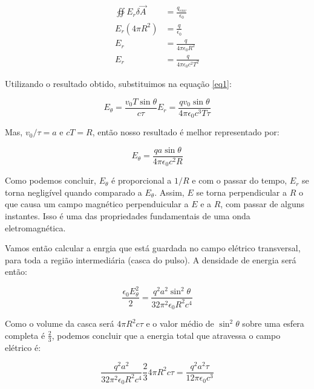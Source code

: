 \documentclass[12pt, letterpaper]{article}
\begin{document}
    \begin{equation} \label{eq2}
    \begin{split}
        \oiint E_r \delta \vec{A} &= \frac{q_{env}}{\epsilon_0} \\
        E_r(4\pi R^2) &= \frac{q}{\epsilon_0} \\
        E_r &= \frac{q}{4\pi\epsilon_0R^2} \\
        E_r &= \frac{q}{4\pi\epsilon_0c^2T^2} 
    \end{split}
    \end{equation}

    Utilizando o resultado obtido, substituimos na equação \ref{eq1}:

    \begin{equation} \label{eq3}
        E_\theta = \frac{v_0T\sin{\theta}}{c\tau}E_r = \frac{qv_0\sin{\theta}}{4\pi\epsilon_0c^3T\tau}
    \end{equation}

    Mas, $v_0 / \tau = a$ e $cT = R$, então nosso resultado é melhor representado por:

    \begin{equation} \label{eq4}
        E_\theta = \frac{qa\sin{\theta}}{4\pi\epsilon_0c^2R}
    \end{equation}

    Como podemos concluir, $E_\theta$ é proporcional a $1/R$ e com o passar do tempo, $E_r$ se torna negligível quando comparado a $E_\theta$. Assim, $E$ se torna perpendicular a $R$ o que causa um campo magnético perpenduicular a $E$ e a $R$, com passar de alguns instantes. Isso é uma das propriedades fundamentais de uma onda eletromagnética.

    Vamos então calcular a enrgia que está guardada no campo elétrico transversal, para toda a região intermediária (casca do pulso). A densidade de energia será então:

    \begin{equation} \label{eq5}
        \frac{\epsilon_0E_\theta^2}{2} = \frac{q^2a^2\sin^2{\theta}}{32\pi^2\epsilon_0R^2c^4}
    \end{equation}    

    Como o volume da casca será $4\pi R^2 c\tau$ e o valor médio de $\sin^2{\theta}$ sobre uma esfera completa é $\frac{2}{3}$, podemos concluir que a energia total que atravessa o campo elétrico é:

    \begin{equation} \label{eq6}
        \frac{q^2a^2}{32\pi^2\epsilon_0R^2c^4}\frac{2}{3}4\pi R^2c\tau = \frac{q^2a^2\tau}{12\pi\epsilon_0c^3}
    \end{equation}    
\end{document}
